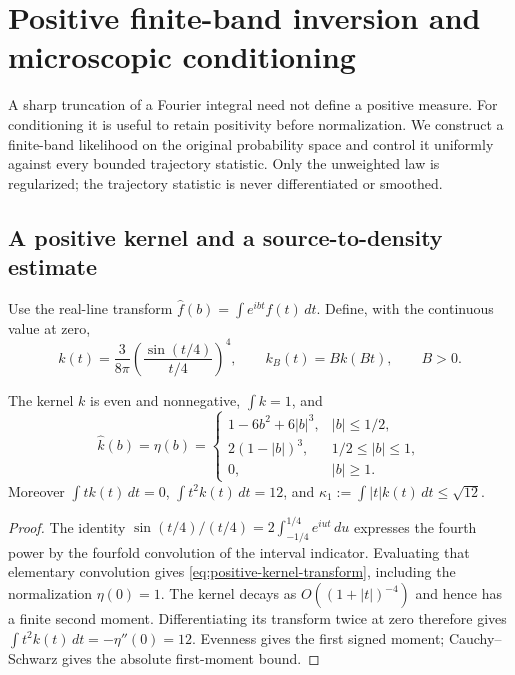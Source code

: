 \section{Positive finite-band inversion and microscopic conditioning}
\label{sec:positive-microscopic-conditioning}
A sharp truncation of a Fourier integral need not define a positive
measure. For conditioning it is useful to retain positivity before
normalization. We construct a finite-band likelihood on the original
probability space and control it uniformly against every bounded
trajectory statistic. Only the unweighted law is regularized; the
trajectory statistic is never differentiated or smoothed.

\subsection{A positive kernel and a source-to-density estimate}
Use the real-line transform $\widehat f(b)=\int e^{ibt}f(t)\,dt$.
Define, with the continuous value at zero,
\begin{equation}\label{eq:positive-bandlimited-kernel}
 k(t)=\frac3{8\pi}\left(\frac{\sin(t/4)}{t/4}\right)^4,
 \qquad k_B(t)=B k(Bt),\qquad B>0.
\end{equation}
\begin{lemma}
\label{lem:positive-kernel-moments}
The kernel $k$ is even and nonnegative, $\int k=1$, and
\begin{equation}\label{eq:positive-kernel-transform}
 \widehat k(b)=\eta(b)=
 \begin{cases}
 1-6b^2+6|b|^3,& |b|\le1/2,\\
 2(1-|b|)^3,&1/2\le|b|\le1,\\
 0,&|b|\ge1.
 \end{cases}
\end{equation}
Moreover $\int t k(t)\,dt=0$, $\int t^2k(t)\,dt=12$, and
$\kappa_1:=\int|t|k(t)\,dt\le\sqrt{12}$.
\end{lemma}
\begin{proof}
The identity
$\sin(t/4)/(t/4)=2\int_{-1/4}^{1/4}e^{iut}\,du$
expresses the fourth power by the fourfold convolution of the interval
indicator. Evaluating that elementary convolution gives
\eqref{eq:positive-kernel-transform}, including the normalization
$\eta(0)=1$. The kernel decays as $O((1+|t|)^{-4})$ and hence has a
finite second moment. Differentiating its transform twice at zero
therefore gives $\int t^2k(t)\,dt=-\eta''(0)=12$.
Evenness gives the first signed moment; Cauchy--Schwarz gives the
absolute first-moment bound.
\end{proof}

